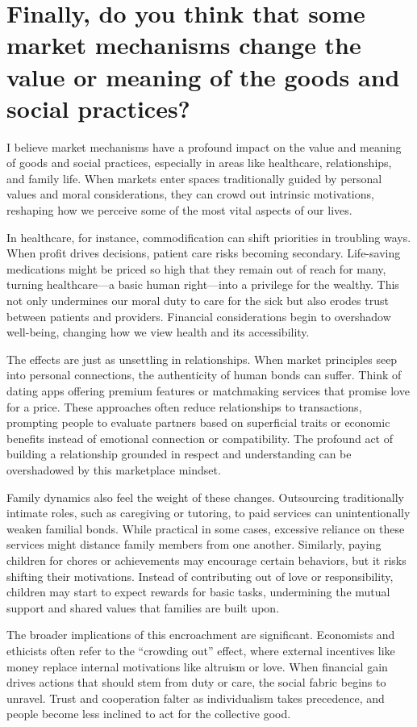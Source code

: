 \section{Finally, do you think that some market mechanisms change the value or meaning of the goods and social practices?}
I believe market mechanisms have a profound impact on the value and meaning of goods and social practices, especially in areas like healthcare, relationships, and family life. When markets enter spaces traditionally guided by personal values and moral considerations, they can crowd out intrinsic motivations, reshaping how we perceive some of the most vital aspects of our lives.

In healthcare, for instance, commodification can shift priorities in troubling ways. When profit drives decisions, patient care risks becoming secondary. Life-saving medications might be priced so high that they remain out of reach for many, turning healthcare---a basic human right---into a privilege for the wealthy. This not only undermines our moral duty to care for the sick but also erodes trust between patients and providers. Financial considerations begin to overshadow well-being, changing how we view health and its accessibility.

The effects are just as unsettling in relationships. When market principles seep into personal connections, the authenticity of human bonds can suffer. Think of dating apps offering premium features or matchmaking services that promise love for a price. These approaches often reduce relationships to transactions, prompting people to evaluate partners based on superficial traits or economic benefits instead of emotional connection or compatibility. The profound act of building a relationship grounded in respect and understanding can be overshadowed by this marketplace mindset.

Family dynamics also feel the weight of these changes. Outsourcing traditionally intimate roles, such as caregiving or tutoring, to paid services can unintentionally weaken familial bonds. While practical in some cases, excessive reliance on these services might distance family members from one another. Similarly, paying children for chores or achievements may encourage certain behaviors, but it risks shifting their motivations. Instead of contributing out of love or responsibility, children may start to expect rewards for basic tasks, undermining the mutual support and shared values that families are built upon.

The broader implications of this encroachment are significant. Economists and ethicists often refer to the ``crowding out'' effect, where external incentives like money replace internal motivations like altruism or love. When financial gain drives actions that should stem from duty or care, the social fabric begins to unravel. Trust and cooperation falter as individualism takes precedence, and people become less inclined to act for the collective good.

